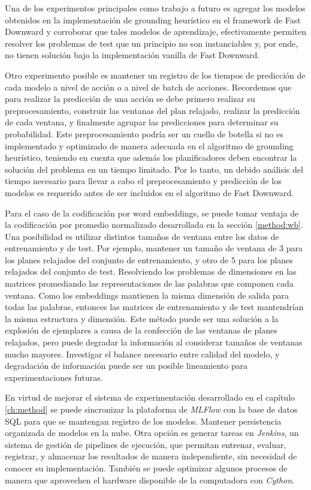 Una de los experimentos principales como trabajo a futuro es agregar los modelos
obtenidos en la implementación de grounding heurístico en el framework de Fast
Downward y corroborar que tales modelos de aprendizaje, efectivamente permiten
resolver los problemas de test que un principio no son instanciables y, por
ende, no tienen solución bajo la implementación vanilla de Fast Downward.

Otro experimento posible es mantener un registro de los tiempos de predicción de
cada modelo a nivel de acción o a nivel de batch de acciones. Recordemos que
para realizar la predicción de una acción se debe primero realizar su
preprocesamiento, construir las ventanas del plan relajado, realizar la
predicción de cada ventana, y finalmente agrupar las predicciones para determinar
su probabilidad. Este preprocesamiento podría ser un cuello de botella si no es
implementado y optimizado de manera adecuada en el algoritmo de grounding
heurístico, teniendo en cuenta que además los planificadores deben encontrar la
solución del problema en un tiempo limitado. Por lo tanto, un debido análisis
del tiempo necesario para llevar a cabo el preprocesamiento y predicción de los
modelos es requerido antes de ser incluidos en el algoritmo de Fast Downward.

Para el caso de la codificación por word embeddings, se puede tomar ventaja de
la codificación por promedio normalizado desarrollada en la sección
\ref{method:wb}. Una posibilidad es utilizar distintos tamaños de ventana entre
los datos de entrenamiento y de test. Por ejemplo, mantener un tamaño de ventana
de $3$ para los planes relajados del conjunto de entrenamiento, y otro de $5$
para los planes relajados del conjunto de test. Resolviendo los problemas de
dimensiones en las matrices promediando las representaciones de las palabras que
componen cada ventana. Como los embeddings mantienen la misma dimensión de
salida para todas las palabras, entonces las matrices de entrenamiento y de test
mantendrían la misma estructura y dimensión. Este método puede ser una solución
a la explosión de ejemplares a causa de la confección de las ventanas de planes
relajados, pero puede degradar la información al considerar tamaños de ventanas
mucho mayores. Investigar el balance necesario entre calidad del modelo, y
degradación de información puede ser un posible lineamiento para
experimentaciones futuras.

En virtud de mejorar el sistema de experimentación desarrollado en el capítulo
\ref{ch:method} se puede sincronizar la plataforma de \emph{MLFlow} con la base
de datos SQL para que se mantengan registro de los modelos. Mantener
persistencia organizada de modelos en la nube. Otra opción es generar tareas en
\emph{Jenkins}, un sistema de gestión de pipelines de ejecución, que permitan
entrenar, evaluar, registrar, y almacenar los resultados de manera
independiente, sin necesidad de conocer su implementación. También se puede
optimizar algunos procesos de manera que aprovechen el hardware disponible de la
computadora con \emph{Cython}.
